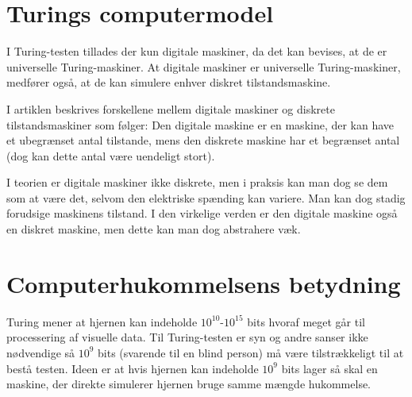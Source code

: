 \documentclass{article}
\author{Mikkel K. Mathiesen, Jannik Gram, Rune \& Rasmus Abrahams{\tt (son|en)}}
\title{}
\date{\today}
\begin{document}
\maketitle
\section{Turings computermodel}



I Turing-testen tillades der kun digitale maskiner, da det kan bevises, at de er universelle Turing-maskiner. At digitale maskiner er universelle Turing-maskiner, medfører også, at de kan simulere enhver diskret tilstandsmaskine.

I artiklen beskrives forskellene mellem digitale maskiner og diskrete tilstandsmaskiner som følger: Den digitale maskine er en maskine, der kan have et ubegrænset antal tilstande, mens den diskrete maskine har et begrænset antal (dog kan dette antal være uendeligt stort).

I teorien er digitale maskiner ikke diskrete, men i praksis kan man dog se dem som at være det, selvom den elektriske spænding kan variere. Man kan dog stadig forudsige maskinens tilstand. I den virkelige verden er den digitale maskine også en diskret maskine, men dette kan man dog abstrahere væk.

\section{Computerhukommelsens betydning}
Turing mener at hjernen kan indeholde $10^{10}$-$10^{15}$ bits hvoraf meget går til processering af visuelle data. Til Turing-testen er syn og andre sanser ikke nødvendige så $10^9$ bits (svarende til en blind person) må være tilstrækkeligt til at bestå testen.
Ideen er at hvis hjernen kan indeholde $10^9$ bits lager så skal en maskine, der direkte simulerer hjernen bruge samme mængde hukommelse.
\end{document}
